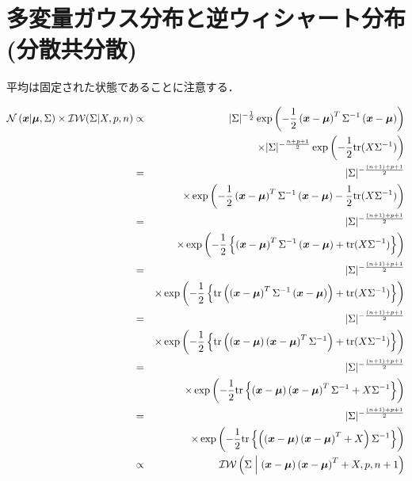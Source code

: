 \documentclass[a4j]{jarticle}
\begin{document}
\section{多変量ガウス分布と逆ウィシャート分布(分散共分散)}
平均は固定された状態であることに注意する．

\begin{eqnarray}
\operatorname{\mathcal{N}}{(\boldsymbol{x} | \boldsymbol{\mu}, \Sigma)} \times \operatorname{\mathcal{IW}}(\Sigma | X, p, n)
&\propto&
|\Sigma|^{-\frac{1}{2}} \exp{\left( -\frac{1}{2} \left( \boldsymbol{x} - \boldsymbol{\mu}\right)^T \Sigma^{-1} \left( \boldsymbol{x} - \boldsymbol{\mu}\right) \right)} \nonumber\\
&&\times |\Sigma|^{-\frac{n+p+1}{2}}\exp{\left(-\frac{1}{2}  \textrm{tr}(X \Sigma^{-1})\right)}\\
&=& |\Sigma|^{-\frac{(n+1)+p+1}{2}} \nonumber \\
&&\times \exp{ \left( -\frac{1}{2} \left( \boldsymbol{x} - \boldsymbol{\mu}\right)^T \Sigma^{-1} \left( \boldsymbol{x} - \boldsymbol{\mu}\right) -\frac{1}{2}  \textrm{tr}(X \Sigma^{-1})\right) }\\
&=& |\Sigma|^{-\frac{(n+1)+p+1}{2}} \nonumber \\
&&\times \exp{ \left( -\frac{1}{2} \left\{ \left( \boldsymbol{x} - \boldsymbol{\mu}\right)^T \Sigma^{-1} \left( \boldsymbol{x} - \boldsymbol{\mu}\right) + \textrm{tr}(X \Sigma^{-1}) \right\} \right) }\\
&=& |\Sigma|^{-\frac{(n+1)+p+1}{2}}\nonumber \\
&&\times \exp{ \left( -\frac{1}{2} \left\{ \textrm{tr}\left( \left( \boldsymbol{x} - \boldsymbol{\mu}\right)^T \Sigma^{-1} \left( \boldsymbol{x} - \boldsymbol{\mu}\right) \right) + \textrm{tr}(X \Sigma^{-1})\right\} \right) }\\
&=& |\Sigma|^{-\frac{(n+1)+p+1}{2}} \nonumber \\
&&\times \exp{ \left( -\frac{1}{2} \left\{ \textrm{tr}\left( \left( \boldsymbol{x} - \boldsymbol{\mu}\right) \left( \boldsymbol{x} - \boldsymbol{\mu}\right)^T \Sigma^{-1} \right) + \textrm{tr}(X \Sigma^{-1})\right\} \right) }\\
&=& |\Sigma|^{-\frac{(n+1)+p+1}{2}} \nonumber \\
&&\times \exp{ \left( -\frac{1}{2} \textrm{tr}\left\{ \left( \boldsymbol{x} - \boldsymbol{\mu}\right) \left( \boldsymbol{x} - \boldsymbol{\mu}\right)^T \Sigma^{-1} + X \Sigma^{-1} \right\} \right) }\\
&=& |\Sigma|^{-\frac{(n+1)+p+1}{2}} \nonumber \\
&&\times \exp{ \left( -\frac{1}{2}  \textrm{tr} \left\{ \left( \left( \boldsymbol{x} - \boldsymbol{\mu}\right) \left(\boldsymbol{x} - \boldsymbol{\mu}\right)^T + X \right)\Sigma^{-1} \right\} \right) }\\
&\propto& \operatorname{\mathcal{IW}}{\left( \Sigma \mathrel{}\middle|\mathrel{} \left( \boldsymbol{x} - \boldsymbol{\mu}\right) \left(\boldsymbol{x} - \boldsymbol{\mu}\right)^T + X, p, n + 1 \right)}
\end{eqnarray}
\end{document}
